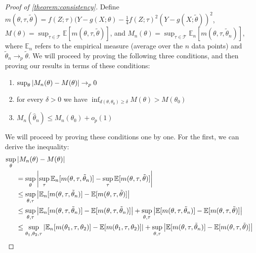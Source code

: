 \documentclass{article}
\theoremstyle{plain}
\theoremstyle{definition}
\newcommand\T{\mathcal T}
\begin{document}
\begin{proof}[Proof of \cref{theorem:consistency}]
Define $m(\theta,\tau,\tilde\theta) = f(Z; \tau)(Y - g(X; \theta) - \frac{1}{4}f(Z;\tau)^2(Y-g(X;\tilde\theta))^2$, $M(\theta) = \sup_{\tau \in \T} \mathbb{E}[m(\theta,\tau,\tilde\theta)]$, and $M_n(\theta) = \sup_{\tau \in \T} \mathbb{E}_n[m(\theta,\tau,\tilde\theta_n)]$, where $\mathbb{E}_n$ refers to the empirical measure (average over the $n$ data points) and $\tilde\theta_n\to_p\tilde\theta$. We will proceed by proving the following three conditions, and then proving our results in terms of these conditions:
\begin{enumerate}
    \item $\sup_\theta \left|M_n(\theta) - M(\theta)\right| \rightarrow_p 0$
    \item for every $\delta > 0$ we have $\inf_{d(\theta, \theta_0) \geq \delta} M(\theta) > M(\theta_0)$
    \item $M_n(\hat\theta_n) \leq M_n(\theta_0) + o_p(1)$
\end{enumerate}

We will proceed by proving these conditions one by one. For the first, we can derive the inequality:
\begin{align}
    \sup_{\theta} &\left|M_n(\theta) - M(\theta)\right| \nonumber \\
    &= \sup_{\theta}\left|\sup_{\tau}\mathbb{E}_n[m(\theta,\tau,\tilde\theta_n)] - \sup_{\tau}\mathbb{E}[m(\theta,\tau,\tilde\theta)]\right| \nonumber \\
    &\leq \sup_{\theta,\tau} \left|\mathbb{E}_n[m(\theta,\tau,\tilde\theta_n)] - \mathbb{E}[m(\theta,\tau,\tilde\theta)]\right| \nonumber \\
    &\leq \sup_{\theta,\tau} \left|\mathbb{E}_n[m(\theta,\tau,\tilde\theta_n)] - \mathbb{E}[m(\theta,\tau,\tilde\theta_n)]\right| + \sup_{\theta,\tau} \left|\mathbb{E}[m(\theta,\tau,\tilde\theta_n)] - \mathbb{E}[m(\theta,\tau,\tilde\theta)]\right| \nonumber \\
    &\leq \sup_{\theta_1,\theta_2,\tau} \left|\mathbb{E}_n[m(\theta_1,\tau,\theta_2)] - \mathbb{E}[m(\theta_1,\tau,\theta_2)]\right| + \sup_{\theta,\tau} \left|\mathbb{E}[m(\theta,\tau,\tilde\theta_n)] - \mathbb{E}[m(\theta,\tau,\tilde\theta)]\right| \nonumber 
\end{align}


\end{proof}
\end{document}
